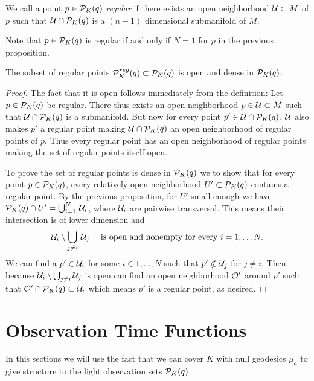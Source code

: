 \begin{definition}\label{def:regpt}
We call a point $p\in {\mathcal{P}}_K(q)$ \emph{regular} if there exists an open neighborhood ${\mathcal{U}}\subset M$ of $p$ such that ${\mathcal{U}}\cap {\mathcal{P}}_K(q)$ is a $(n-1)$ dimensional submanifold of $M$.

Note that $p\in {\mathcal{P}}_K(q)$ is regular if and only if $N=1$ for $p$ in the previous proposition.
\end{definition}


\begin{corollary}\label{cor:opendense}
    The subset of regular points ${\mathcal{P}}^{reg}_K(q)\subset {\mathcal{P}}_K(q)$ is open and dense in ${\mathcal{P}}_K(q)$.
\end{corollary}
\begin{proof}
The fact that it is open follows immediately from the definition: Let $p\in {\mathcal{P}}_K(q)$ be regular. There thus exists an open neighborhood $p\in {\mathcal{U}}\subset M$ such that $\mathcal{U} \cap {\mathcal{P}}_K(q)$ is a submanifold. But now for every point $p'\in \mathcal{U}\cap{\mathcal{P}}_K(q)$, ${\mathcal{U}}$ also makes $p'$ a regular point making $\mathcal{U}\cap{\mathcal{P}}_K(q)$ an open neighborhood of regular points of $p$. Thus every regular point has an open neighborhood of regular points making the set of regular points itself open.

To prove the set of regular points is dense in ${{\mathcal{P}}_K(q)}$ we to show that for every point $p\in {\mathcal{P}}_K(q)$, every relatively open neighborhood $U'\subset{\mathcal{P}}_K(q)$ contains a regular point. By the previous proposition, for $U'$ small enough we have ${\mathcal{P}}_K(q)\cap U' = \bigcup_{i=1}^N\,\mathcal{U}_i$, where $\mathcal{U}_i$ are pairwise transversal. This means their intersection is of lower dimension and 
\[
    \mathcal{U}_i \setminus \bigcup_{j\neq i}\, \mathcal{U}_j \quad \text{ is open and nonempty for every }i=1,\dots N.
\]
We can find a $p'\in {\mathcal{U}}_i$ for some $i\in 1,\dots,N$ such that $p'\notin {\mathcal{U}}_j$ for $j\neq i$. Then because $\mathcal{U}_i \setminus \bigcup_{j\neq i} {\mathcal{U}}_j$ is open can find an open neighborhood ${\mathcal{O}}'$ around $p'$ such that ${\mathcal{O}}'\cap {\mathcal{P}}_K(q)\subset {\mathcal{U}}_i$ which means $p'$ is a regular point, as desired.
\end{proof}

\section{Observation Time Functions}
In this sections we will use the fact that we can cover $K$ with null geodesics $\mu_a$ to give structure to the light observation sets ${\mathcal{P}}_K(q)$.

